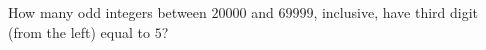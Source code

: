 How many odd integers between $20000$ and $69999$, inclusive, have third digit (from the left) equal to $5$?
